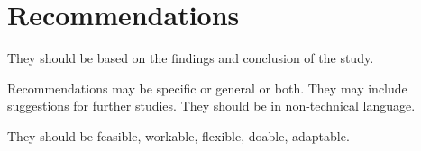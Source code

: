 \chapter{Recommendations} %

\label{ch:Recommendations} %
They should be based on the findings and
conclusion of the study.

Recommendations may be specific or general or
both. They may include suggestions for further
studies.
They should be in non-technical language.

They should be feasible, workable, flexible, doable, adaptable.
